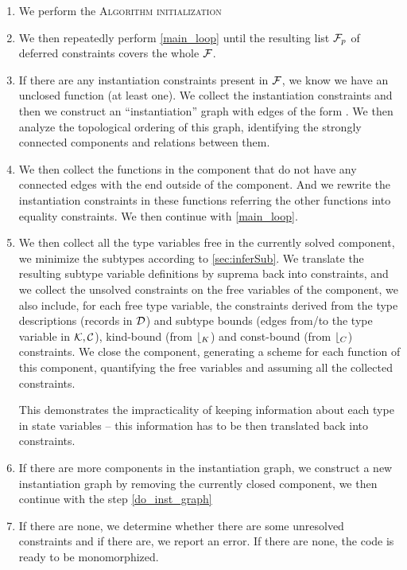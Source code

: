 \begin{enumerate}
    \item We perform the \textsc{Algorithm initialization}

    \item We then repeatedly perform \cref{main_loop} until the resulting list $\mathcal F_p$ of deferred constraints covers the whole $\mathcal{F}$.

    \item If there are any instantiation constraints present in $\mathcal F$, we know we have an unclosed function (at least one). We collect the instantiation constraints and then we construct an ``instantiation'' graph with edges of the form . We then analyze the topological ordering of this graph, identifying the strongly connected components and relations between them.

    \item We then collect the functions in the component that do not have any connected edges with the  end outside of the component. And we rewrite the instantiation constraints in these functions referring the other functions into equality constraints. We then continue with \cref{main_loop}. \label{do_inst_graph}

    \item We then collect all the type variables free in the currently solved component, we minimize the subtypes according to \cref{sec:inferSub}. We translate the resulting subtype variable definitions by suprema back into constraints, and we collect the unsolved constraints on the free variables of the component, we also include, for each free type variable, the constraints derived from the type descriptions (records in $\mathcal{D}$) and subtype bounds (edges from/to the type variable in $\mathcal K, \mathcal C$), kind-bound (from $\mathcal b_K$) and const-bound (from $\mathcal b_C$) constraints. We close the component, generating a scheme for each function of this component, quantifying the free variables and assuming all the collected constraints. \label{closing}

    This demonstrates the impracticality of keeping information about each type in state variables -- this information has to be then translated back into constraints.

    \item If there are more components in the instantiation graph, we construct a new instantiation graph by removing the currently closed component, we then continue with the step \ref{do_inst_graph}

    \item If there are none, we determine whether there are some unresolved constraints and if there are, we report an error. If there are none, the code is ready to be monomorphized.
\end{enumerate}

